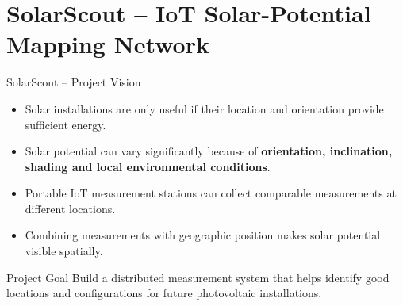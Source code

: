\part[nopartpage]{SolarScout -- IoT Solar-Potential Mapping Network}

\begin{frame}{SolarScout -- Project Vision}
\begin{itemize}
    \item Solar installations are only useful if their location and orientation provide sufficient energy.
    \item Solar potential can vary significantly because of \textbf{orientation, inclination, shading and local environmental conditions}.
    \item Portable IoT measurement stations can collect comparable measurements at different locations.
    \item Combining measurements with geographic position makes solar potential visible spatially.
\end{itemize}

\begin{block}{Project Goal}
Build a distributed measurement system that helps identify good locations and configurations for future photovoltaic installations.
\end{block}
\end{frame}
